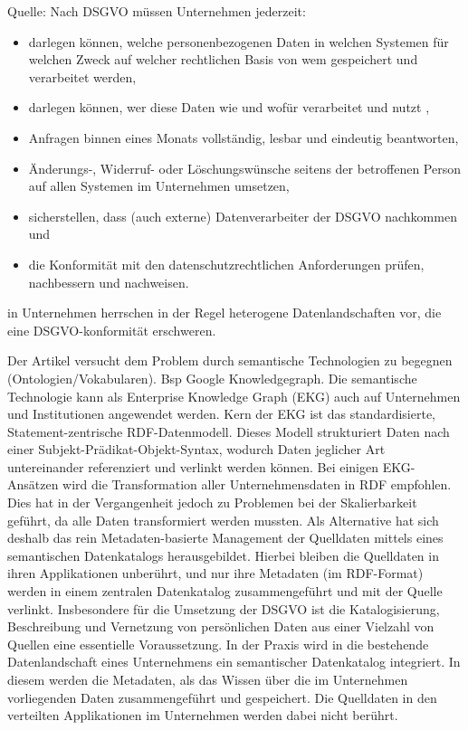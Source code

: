 Quelle: \cite{Brockmann2018}
Nach DSGVO müssen Unternehmen jederzeit: 
\begin{itemize}
\item	darlegen können, welche personenbezogenen Daten in welchen Systemen für welchen Zweck auf welcher rechtlichen Basis von wem gespeichert und verarbeitet werden,\cite[Kapitel II Artikel 13]{union2016verordnung}
\item darlegen können, wer diese Daten wie und wofür verarbeitet und nutzt \cite[Kapitel II Artikel 14]{union2016verordnung},
\item Anfragen binnen eines Monats vollständig, lesbar und eindeutig beantworten\cite[Kapitel II Artikel 15]{union2016verordnung}, 
\item Änderungs-, Widerruf- oder Löschungswünsche seitens der
betroffenen Person auf allen Systemen im Unternehmen umsetzen\cite[Kapitel II Artikel 16,17,19,21]{union2016verordnung},
\item sicherstellen, dass (auch externe) Datenverarbeiter der DSGVO
nachkommen \cite[Kapitel II Artikel 28]{union2016verordnung} und
\item die Konformität mit den datenschutzrechtlichen Anforderungen
prüfen, nachbessern und nachweisen.

\end{itemize}

in Unternehmen herrschen in der Regel heterogene Datenlandschaften vor, die eine DSGVO-konformität erschweren.

Der Artikel versucht dem Problem durch semantische Technologien zu begegnen (Ontologien/Vokabularen). Bsp Google Knowledgegraph.
Die semantische Technologie kann als Enterprise Knowledge
Graph (EKG) auch auf Unternehmen und Institutionen angewendet
werden.
Kern der EKG ist das standardisierte, Statement-zentrische
RDF-Datenmodell. Dieses Modell strukturiert Daten nach einer
Subjekt-Prädikat-Objekt-Syntax, wodurch Daten jeglicher Art
untereinander referenziert und verlinkt werden können.
Bei einigen EKG-Ansätzen wird die Transformation aller Unternehmensdaten
in RDF empfohlen. Dies hat in der Vergangenheit
jedoch zu Problemen bei der Skalierbarkeit geführt, da alle
Daten transformiert werden mussten. Als Alternative hat sich
deshalb das rein Metadaten-basierte Management der Quelldaten
mittels eines semantischen Datenkatalogs herausgebildet. Hierbei
bleiben die Quelldaten in ihren Applikationen unberührt,
und nur ihre Metadaten (im RDF-Format) werden in einem zentralen
Datenkatalog zusammengeführt und mit der Quelle verlinkt.
Insbesondere für die Umsetzung der DSGVO ist die Katalogisierung,
Beschreibung und Vernetzung von persönlichen Daten
aus einer Vielzahl von Quellen eine essentielle Voraussetzung.
In der Praxis wird in die bestehende Datenlandschaft eines
Unternehmens ein semantischer Datenkatalog integriert. In diesem
werden die Metadaten, als das Wissen über die im Unternehmen
vorliegenden Daten zusammengeführt und gespeichert.
Die Quelldaten in den verteilten Applikationen im Unternehmen
werden dabei nicht berührt.


